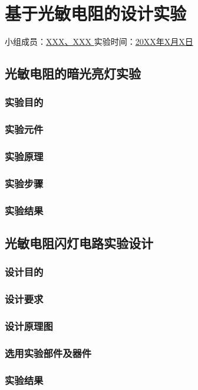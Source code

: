 \section{基于光敏电阻的设计实验}

\begin{center}
    {
        小组成员：\underline{\quad XXX、XXX \quad} \quad
        实验时间：\underline{\quad 20XX年X月X日 \quad}
    }
\end{center}
\subsection{光敏电阻的暗光亮灯实验}

\subsubsection{实验目的}

\subsubsection{实验元件}

\subsubsection{实验原理}

\subsubsection{实验步骤}

\subsubsection{实验结果}

\subsection{光敏电阻闪灯电路实验设计}

\subsubsection{设计目的}

\subsubsection{设计要求}

\subsubsection{设计原理图}

\subsubsection{选用实验部件及器件}

\subsubsection{实验结果}

\newpage